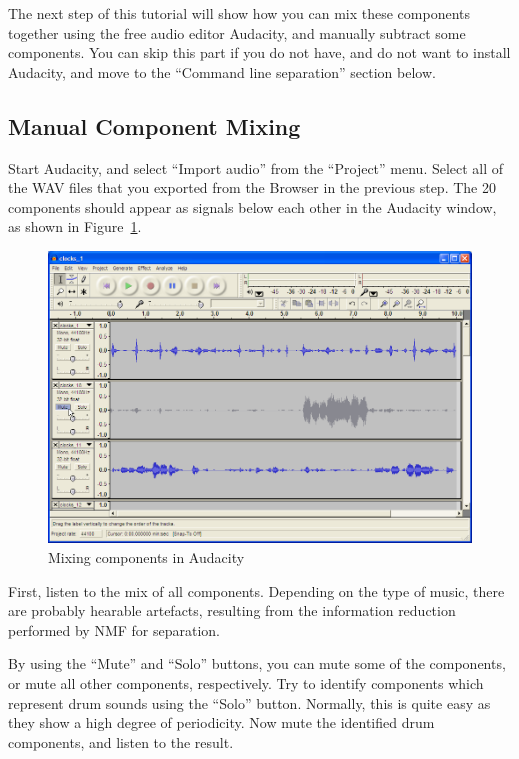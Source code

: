 The next step of this tutorial will show how you can mix these components together using the free audio editor Audacity, and manually subtract some components. You can skip this part if you do not have, and do not want to install Audacity, and move to the ``Command line separation'' section below.

\subsection{Manual Component Mixing}

Start Audacity, and select ``Import audio'' from the ``Project'' menu. Select all of the WAV files that you exported from the Browser in the previous step. The 20 components should appear as signals below each other in the Audacity window, as shown in Figure~\ref{figure:TutorialAudacityMix}.

\begin{figure}
    \centering
    \includegraphics[width=\textwidth]{tutorial-media/AudacityMix.png}
    \caption{%
        \label{figure:TutorialAudacityMix}%
        Mixing components in Audacity
    }
\end{figure}

First, listen to the mix of all components. Depending on the type of music,
there are probably hearable artefacts, resulting from the information reduction
performed by NMF for separation.

By using the ``Mute'' and ``Solo'' buttons, you can mute some of the
components, or mute all other components, respectively. Try to identify
components which represent drum sounds using the ``Solo'' button. Normally,
this is quite easy as they show a high degree of periodicity. Now mute the
identified drum components, and listen to the result.


